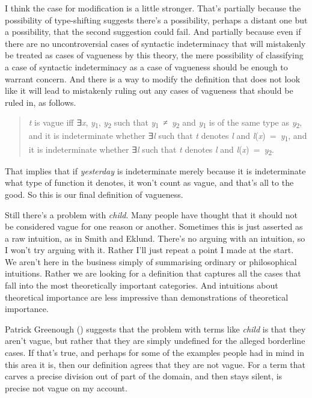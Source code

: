 \documentclass[
  10pt,
  letterpaper,
  DIV=11,
  numbers=noendperiod,
  twoside]{scrartcl}
\begin{document}
I think the case for modification is a little stronger. That's partially
because the possibility of type-shifting suggests there's a possibility,
perhaps a distant one but a possibility, that the second suggestion
could fail. And partially because even if there are no uncontroversial
cases of syntactic indeterminacy that will mistakenly be treated as
cases of vagueness by this theory, the mere possibility of classifying a
case of syntactic indeterminacy as a case of vagueness should be enough
to warrant concern. And there is a way to modify the definition that
does not look like it will lead to mistakenly ruling out any cases of
vagueness that should be ruled in, as follows.

\begin{quote}
\emph{t} is vague iff ∃\emph{x}, \emph{y}\textsubscript{1},
\emph{y}\textsubscript{2} such that
\emph{y}\textsubscript{1}~≠~\emph{y}\textsubscript{2} and
\emph{y}\textsubscript{1} is of the same type as
\emph{y}\textsubscript{2}, and it is indeterminate whether ∃\emph{l}
such that \emph{t} denotes \emph{l} and
\emph{l}(\emph{x})~=~\emph{y}\textsubscript{1}, and it is indeterminate
whether ∃\emph{l} such that \emph{t} denotes \emph{l} and
\emph{l}(\emph{x})~=~\emph{y}\textsubscript{2}.
\end{quote}

That implies that if \emph{yesterday} is indeterminate merely because it
is indeterminate what type of function it denotes, it won't count as
vague, and that's all to the good. So this is our final definition of
vagueness.

Still there's a problem with \emph{child}. Many people have thought that
it should not be considered vague for one reason or another. Sometimes
this is just asserted as a raw intuition, as in Smith and Eklund.
There's no arguing with an intuition, so I won't try arguing with it.
Rather I'll just repeat a point I made at the start. We aren't here in
the business simply of summarising ordinary or philosophical intuitions.
Rather we are looking for a definition that captures all the cases that
fall into the most theoretically important categories. And intuitions
about theoretical importance are less impressive than demonstrations of
theoretical importance.

Patrick Greenough () suggests that the
problem with terms like \emph{child} is that they aren't vague, but
rather that they are simply undefined for the alleged borderline cases.
If that's true, and perhaps for some of the examples people had in mind
in this area it is, then our definition agrees that they are not vague.
For a term that carves a precise division out of part of the domain, and
then stays silent, is precise not vague on my account.
\end{document}

